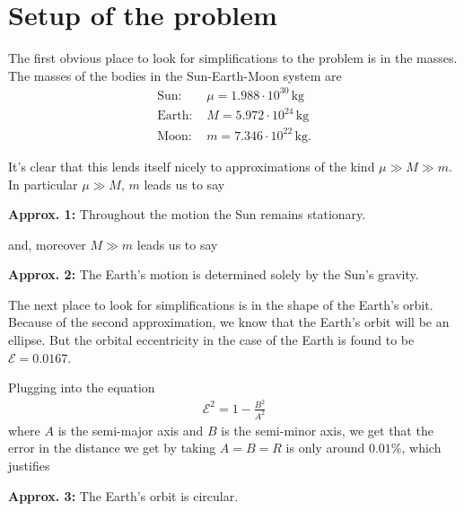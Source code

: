 \documentclass[12pt,a4paper]{article}
\begin{document}
\section{Setup of the problem}

The first obvious place to look for simplifications to the problem is in the masses. The masses of the bodies in the Sun-Earth-Moon system are \cite{podatoci}
%
\begin{align*}
\text{Sun: }& \mu = 1.988 \cdot 10^{30} \, \mathrm{kg} \\ 
\text{Earth: }& M = 5.972 \cdot 10^{24} \, \mathrm{kg} \\
\text{Moon: }& m = 7.346 \cdot 10^{22} \, \mathrm{kg}.
\end{align*}
%

It's clear that this lends itself nicely to approximations of the kind $\mu \gg M \gg m$. In particular $\mu \gg M, \, m $ leads us to say

\vspace{0.35cm}
\noindent
\textbf{Approx. 1:} Throughout the motion the Sun remains stationary.
\vspace{0.35cm}

\noindent
and, moreover $M \gg m $ leads us to say

\vspace{0.35cm}
\noindent
\textbf{Approx. 2:} The Earth's motion is determined solely by the Sun's gravity.
\vspace{0.35cm}

The next place to look for simplifications is in the shape of the Earth's orbit. Because of the second approximation, we know that the Earth's orbit will be an ellipse. But the orbital eccentricity in the case of the Earth is found to be $\mathcal{E} = 0.0167$. \cite{podatoci}

Plugging into the equation
%
\begin{align}
\mathcal{E}^2 = 1 - \frac{B^2}{A^2}
\end{align}
%
where $A$ is the semi-major axis and $B$ is the semi-minor axis, we get that the error in the distance we get by taking $A = B = R$ is only around $0.01 \%$, which justifies

\vspace{0.35cm}
\noindent
\textbf{Approx. 3:} The Earth's orbit is circular.
\vspace{0.35cm}
\end{document}
